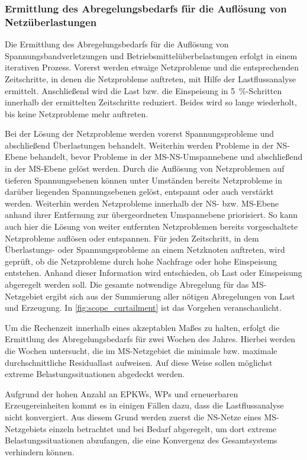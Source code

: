 


\subsubsection{Ermittlung des Abregelungsbedarfs für die Auflösung von Netzüberlastungen}

Die Ermittlung des Abregelungsbedarfs für die Auflösung von Spannungsbandverletzungen und Betriebsmittelüberbelastungen erfolgt in einem iterativen Prozess.
Vorerst werden etwaige Netzprobleme und die entsprechenden Zeitschritte, in denen die Netzprobleme auftreten, mit Hilfe der Lastflussanalyse ermittelt.
Anschließend wird die Last bzw. die Einspeisung in \SI{5}{\percent}-Schritten innerhalb der ermittelten Zeitschritte reduziert.
Beides wird so lange wiederholt, bis keine Netzprobleme mehr auftreten.\medskip

Bei der Lösung der Netzprobleme werden vorerst Spannungsprobleme und abschließend Überlastungen behandelt.
Weiterhin werden Probleme in der \gls{NS}-Ebene behandelt, bevor Probleme in der \gls{MS}-\gls{NS}-Umspannebene und abschließend in der \gls{MS}-Ebene gelöst werden.
Durch die Auflösung von Netzproblemen auf tieferen Spannungsebenen können unter Umständen bereits Netzprobleme in darüber liegenden Spannungsebenen gelöst, entspannt oder auch verstärkt werden.
Weiterhin werden Netzprobleme innerhalb der \gls{NS}- bzw. \gls{MS}-Ebene anhand ihrer Entfernung zur übergeordneten Umspannebene priorisiert.
So kann auch hier die Lösung von weiter entfernten Netzproblemen bereits vorgeschaltete Netzprobleme auflösen oder entspannen.
Für jeden Zeitschritt, in dem Überlastungs- oder Spannungsprobleme an einem Netzknoten auftreten, wird geprüft, ob die Netzprobleme durch hohe Nachfrage oder hohe Einspeisung entstehen.
Anhand dieser Information wird entschieden, ob Last oder Einspeisung abgeregelt werden soll.
Die gesamte notwendige Abregelung für das \gls{MS}-Netzgebiet ergibt sich aus der Summierung aller nötigen Abregelungen von Last und Erzeugung.
In \autoref{fig:scope_curtailment} ist das Vorgehen veranschaulicht. \cite{Schachler}



Um die Rechenzeit innerhalb eines akzeptablen Maßes zu halten, erfolgt die Ermittlung des Abregelungsbedarfs für zwei Wochen des Jahres.
Hierbei werden die Wochen untersucht, die im \gls{MS}-Netzgebiet die minimale bzw. maximale durchschnittliche Residuallast aufweisen.
Auf diese Weise sollen möglichst extreme Belastungssituationen abgedeckt werden.\medskip

Aufgrund der hohen Anzahl an \glspl{EPKW}, \glspl{WP} und erneuerbaren Erzeugereinheiten kommt es in einigen Fällen dazu, dass die Lastflussanalyse nicht konvergiert.
Aus diesem Grund werden zuerst die \gls{NS}-Netze eines \gls{MS}-Netzgebiets einzeln betrachtet und bei Bedarf abgeregelt, um dort extreme Belastungssituationen abzufangen, die eine Konvergenz des Gesamtsystems verhindern können.

\clearpage
